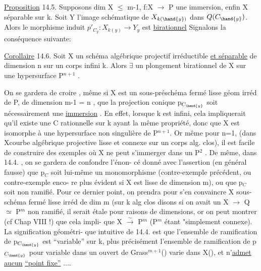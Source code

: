 
\uline{Proposition} 14.5. Supposons dim X $\leqslant$ m-1, 
 f:X $\to$ P une immersion,  enfin X séparable sur k. Soit Y l'image
schématique de $X_{k(\hand{y})}$ dans $Q(C_{\hand{y}})$. Alors le morphisme induit
$p'_{C_y} : X_{k(y)} \to Y_y$ est \uline{birationnel}
Signalons la conséquence suivante:

\uline{Corollaire} 14.6. Soit X un schéma algébrique projectif irréductible 
\uline{et séparable}
de dimension n sur un corps infini k. Alors  $\exists$ un plongement birationnel de X
  sur une hypersurface  P$^{n+1}$ .

On se gardera de croire , même si X est un sous-préschéma fermé
lisse géom irréd de P, de dimension m-1 = n , que la projection conique p$_{C_{\hand{y}}}$
soit nécessairement une \uline{immersion} . En effet, lorsque k est infini, cela impliquerait
qu'il existe une C rationnelle sur k ayant la même propriété, donc que X
est isomorphe à une hypersurface non singulière de  P$^{n+1}$. Or
même pour n=1, (dans Xcourbe algébrique projective lisse  et connexe sur un corps alg.
clos), il est facile de construire des exemples où X ne peut s'immerger
dans un P$^2$ . De même, dans 14.4. , on se gardera de confondre l'énon-%
cé donné avec l'assertion (en général fausse) que p$_C$ soit lui-même un
monomorphisme (contre-exemple précédent, ou contre-exemple enco-%
re plus évident si X est lisse de dimension m), ou que p$_C$ soit non
ramifié. Pour ce dernier point, on prendra pour s'en convaincre X
sous-schéma fermé lisse  irréd de dim m (sur k alg clos disons
si  on avait un X $\to$ Q $\simeq$ P$^m$ non ramifié, il serait étale pour
raisons de dimensions, or on peut montrer (cf Chap VIII !) que cela impli-%
que X $\xrightarrow{\sim}$ P$^m$ (P$^m$ étant "simplement connexe). \hand{--} La signification géométri-%
que intuitive de 14.4. est que l'ensemble de
ramification de p$_{C_{\hand{y}}}$ est ``variable'' sur k, plus précisément l'ensemble de
ramification de p$_{C_{\hand{y}}}$ pour  variable dans un ouvert de Grass$^{m+1}$() varie dans X(), et
n'\uline{admet aucun}  \uline{``point fixe''} ....

